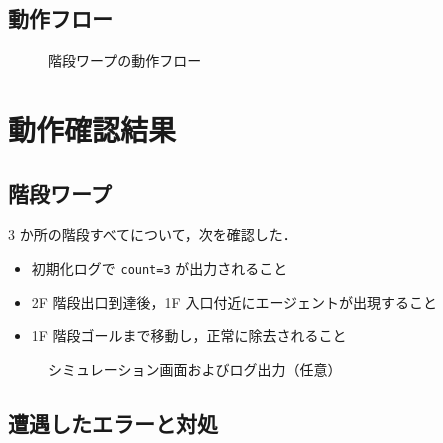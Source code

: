 \documentclass[11pt,a4paper]{ltjsarticle}
\begin{document}
\subsection{動作フロー}

\begin{figure}[H]
  \centering
  \caption{階段ワープの動作フロー}
  \label{fig:flow}
\end{figure}

\section{動作確認結果}

\subsection{階段ワープ}

3 か所の階段すべてについて，次を確認した．
\begin{itemize}
  \item 初期化ログで \texttt{count=3} が出力されること
  \item 2F 階段出口到達後，1F 入口付近にエージェントが出現すること
  \item 1F 階段ゴールまで移動し，正常に除去されること
\end{itemize}

\begin{figure}[H]
  \centering
  \caption{シミュレーション画面およびログ出力（任意）}
  \label{fig:simulation}
\end{figure}

\subsection{遭遇したエラーと対処}
\end{document}

